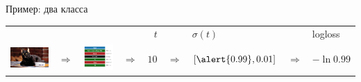\documentclass[notes,12pt, aspectratio=169]{beamer}
\begin{document}
\begin{frame}{Пример: два класса}
\begin{tabular}{m{2.5cm} m{0.35cm} m{1.8cm} m{0.35cm} m{0.5cm} m{0.35cm} m{2cm}  m{0.5cm} m{3.2cm}}
	& & & &  {\large  $\mbox{ }t$ } &  &  {\large \hspace{8pt} $\sigma(t)$} &  &  {\large logloss} \\
	\includegraphics[scale=0.2]{tab_cat.png} & {\Large $\Rightarrow$} & \includegraphics[scale=0.2]{tab_nn.png}  &  {\Large $\Rightarrow$} &  $10$ &  {\Large $\Rightarrow$} &  $[\alert{0.99}, 0.01]$ & {\Large $\Rightarrow$}  & $-\ln 0.99$ \\


\end{tabular}
\end{frame}
\end{document}
